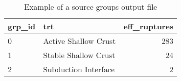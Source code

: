 \begin{table}[htbp]
\centering
\begin{tabular}{llr}

\hline
\rowcolor{lightgray}
\bf{grp\_id} & \bf{trt} & \bf{eff\_ruptures} \\
\hline
0 & Active Shallow Crust & 283 \\
1 & Stable Shallow Crust & 24 \\
2 & Subduction Interface & 2 \\
\hline

\end{tabular}
\caption{Example of a source groups output file}
\label{output:event_based_sourcegroups}
\end{table}
